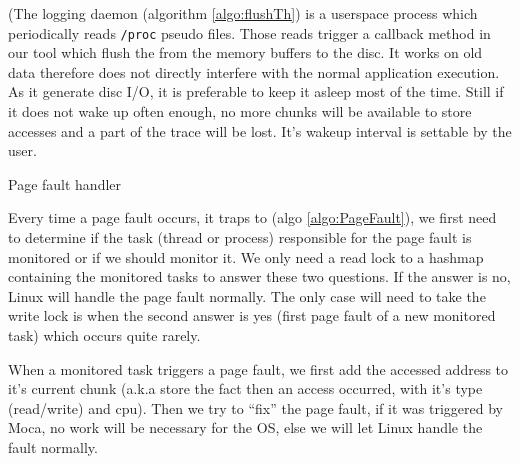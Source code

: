 (The logging daemon (algorithm \ref{algo:flushTh}) is a userspace process
which periodically reads \texttt{/proc} pseudo files. Those reads trigger a
callback method in our tool which flush the  from the memory buffers to the
disc. It works on old data therefore does not directly interfere with the
normal application execution. As it generate disc I/O, it is preferable to
keep it asleep most of the time. Still if it does not wake up often enough, no
more chunks will be available to store accesses and a part of the trace will
be lost. It's wakeup interval is settable by the user.

\begin{algorithm}[htb]
    \caption{Page fault handler}
    \label{algo:PageFault}
    \begin{algorithmic}[1]
                    \State {}
                    \State {}
                    \State \Return
                \EndIf
            \EndIf
            \State {}
            \State {}
                \State {}
            \EndIf
            \State {}
            \State {}
        \EndFunction
    \end{algorithmic}
\end{algorithm}

Every time a page fault occurs, it traps to \Moca (algo
\ref{algo:PageFault}), we first need to determine if the task
(thread or process) responsible for the page fault is
monitored or if we should monitor it. We only need a read lock
to a hashmap containing the monitored tasks to answer these
two questions. If the answer is no, Linux will handle the page
fault normally. The only case will need to take the write lock
is when the second answer is yes (first page fault of a new
monitored task) which occurs quite rarely.

When a monitored task triggers a page fault, we first add the
accessed address to it's current chunk (a.k.a store the fact
then an access occurred, with it's type (read/write) and cpu).
Then we try to ``fix'' the page fault, if it was triggered by
Moca, no work will be necessary for the OS, else we will let
Linux handle the fault normally.

